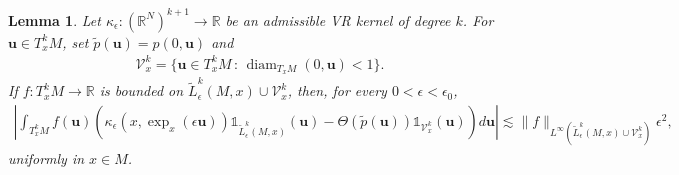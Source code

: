 \documentclass[11pt,reqno]{amsproc}
\numberwithin{equation}{section}
\newcommand{\R}{\mathbb{R}}
\newcommand{\one}{\mathbb{1}}
\newcommand{\bu}{\mathbf{u}}
\newcommand{\cV}{\mathcal{V}}
\newcommand{\tp}{\tilde{p}}
\newcommand{\tL}{\widetilde{L}}
\newcommand{\ls}{\lesssim}
\newcommand{\diam}{\operatorname{diam}}
\newtheorem{lemma}[counter]{Lemma}
\theoremstyle{definition}
\theoremstyle{plain}
\begin{document}
    \begin{lemma} \label{lem:kappa_domain_replacement}
        Let $\kappa_\epsilon : (\R^N)^{k+1} \to \R$ be an admissible VR kernel of degree $k$. For $\bu \in T_x^k M$, set $\tp(\bu) = p(0, \bu)$ and
        \begin{align}
            \cV_x^k = \{ \bu \in T^k_x M \, : \, \diam_{T_x M} (0, \bu) < 1\}.
        \end{align}
        If $f:T_x^kM\to\R$ is bounded on $\tL^k_\epsilon(M,x)\cup \cV_x^k$, then, for every $0<\epsilon<\epsilon_0$,
        \begin{align} \label{eq:kappa_domain_replacement}
            \left|\int_{T_x^kM} f(\bu)\left(\kappa_\epsilon(x,\exp_x(\epsilon\bu))\one_{\tL^k_\epsilon(M,x)}(\bu)-\Theta(\tp(\bu))\one_{\cV_x^k}(\bu)\right)d\bu\right|
            \ls \|f\|_{L^\infty(\tL^k_\epsilon(M,x)\cup \cV_x^k)}\epsilon^2,
        \end{align}
        uniformly in $x\in M$.
    \end{lemma}
\end{document}
